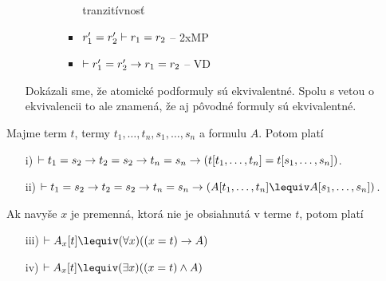 \begin{dokaz}
\begin{itemize}
\begin{itemize}
\begin{itemize}
\begin{itemize}
                            tranzitívnosť
                \item $r_1'=r_2' \vdash r_1 = r_2$ -- 2xMP
                \item $\vdash r_1'=r_2' \rightarrow r_1=r_2$ -- VD
                \end{itemize}
            \end{itemize}
        \end{itemize}
        Dokázali sme, že atomické podformuly sú ekvivalentné. Spolu s
        vetou o ekvivalencii to ale znamená, že aj pôvodné formuly sú
        ekvivalentné.
\end{itemize}
\end{dokaz}

\begin{veta}
    Majme term $t$, termy $t_1,\dots,t_n, s_1,\dots, s_n$ a formulu
    $A$.
    Potom platí
    \begin{itemize}
        \item[i)] $\vdash t_1=s_2 \rightarrow t_2=s_2 \rightarrow
            t_n=s_n \rightarrow (t[t_1,\dots,t_n] = t[s_1,\dots,s_n])$.
        \item[ii)] $\provable t_1=s_2 \implies t_2=s_2 \implies
            t_n=s_n \implies (A[t_1,\dots,t_n] \lequiv 
                              A[s_1,\dots,s_n])$.
    \end{itemize}
    Ak navyše $x$ je premenná, ktorá nie je obsiahnutá v terme $t$,
    potom platí
    \begin{itemize}
        \item[iii)] $\provable A_x[t] \lequiv 
            (\forall x)((x=t) \implies A)$
        \item[iv)] $\provable A_x[t] \lequiv 
            (\exists x)((x=t) \land A)$
    \end{itemize}
\end{veta}
